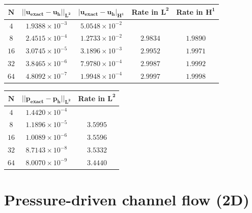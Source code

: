\documentclass[11pt,a4paper,titlepage]{report}
\begin{document}
\begin{center}
\begin{tabular}{| c | c | c | c | c |}
\hline
$  \mathbf{N}$ & $ \mathbf{|| u_{exact} - u_h ||_{L^2}}$ & $  \mathbf{ | u_{exact} - u_h |_{H^1}}$ & \textbf{Rate in }  $ \mathbf{L^2}$ & \textbf{Rate in } $  \mathbf{H^1}$  \\
\hline
$ 4 $ & $1.9388 \times 10^{-3}$ & $5.0548 \times 10^{-2}$  & & \\
\hline
$ 8$ & $2.4515  \times 10^{-4}$ & $1.2733 \times 10^{-2}$ &  $2.9834$ &  $1.9890$   \\
\hline
$ 16 $ & $ 3.0745 \times 10^{-5}$ & $3.1896 \times 10^{-3}$ & $ 2.9952 $ & $1.9971$   \\
\hline
$ 32$ & $3.8465 \times 10^{-6}$ & $7.9780 \times 10^{-4}$ & $ 2.9987 $ & $ 1.9992 $  \\
\hline
$ 64$ & $4.8092 \times 10^{-7}$ & $1.9948 \times 10^{-4}$  & $ 2.9997 $ & $1.9998$ \\
\hline
\end{tabular}
\end{center}



\begin{center}
\begin{tabular}{| c | c | c |}
\hline
$\mathbf{N}$ & $\mathbf{|| p_{exact} - p_h ||_{L^2}}$ & \textbf{Rate in } $  \mathbf{L^2}$  \\
\hline
$ 4 $ & $1.4420  \times 10^{-4} $ & \\
\hline
$ 8 $ & $ 1.1896  \times 10^{-5} $ & $3.5995$ \\
\hline
$ 16 $ & $ 1.0089  \times 10^{-6} $ & $3.5596$ \\
\hline
$ 32 $ & $  8.7143 \times 10^{-8} $ & $3.5332$ \\
\hline
$ 64 $ & $ 8.0070 \times 10^{-9} $ & $3.4440$ \\
\hline
\end{tabular}
\end{center}




\section{Pressure-driven channel flow (2D)}

\end{document}
